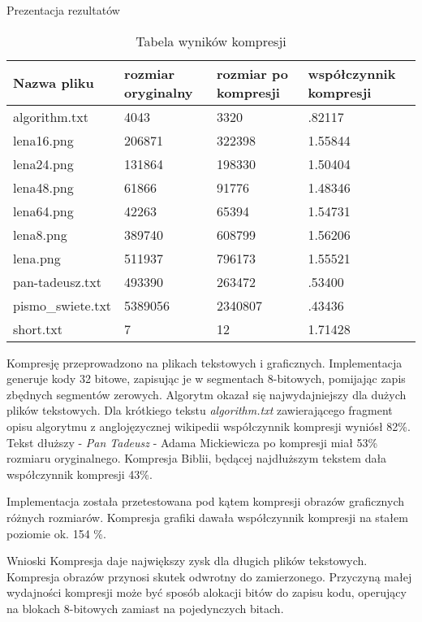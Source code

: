 \documentclass{article}
\begin{document}
  \begin{section}{Prezentacja rezultatów}
    \begin{table}[h]
    \begin{tabular}{| l | l | l | l |}
      \hline
      Nazwa pliku		& rozmiar oryginalny	& rozmiar po kompresji& współczynnik kompresji	\\\hline
      \hline
      algorithm.txt		&	4043	&	3320	&	.82117	\\\hline
      lena16.png		&	206871	&	322398	&	1.55844	\\\hline
      lena24.png		&	131864	&	198330	&	1.50404	\\\hline
      lena48.png		&	61866	&	91776	&	1.48346	\\\hline
      lena64.png		&	42263	&	65394	&	1.54731	\\\hline
      lena8.png			&	389740	&	608799	&	1.56206	\\\hline
      lena.png			&	511937	&	796173	&	1.55521	\\\hline
      pan-tadeusz.txt		&	493390	&	263472	&	.53400	\\\hline
      pismo\_swiete.txt		&	5389056	&	2340807	&	.43436	\\\hline
      short.txt			&	7	&	12	&	1.71428	\\\hline
    \end{tabular}
    \caption{Tabela wyników kompresji}
    \end{table}
    Kompresję przeprowadzono na plikach tekstowych i graficznych. 
    Implementacja generuje kody 32 bitowe, zapisując je w segmentach 8-bitowych, pomijając zapis
    zbędnych segmentów zerowych. 
    Algorytm okazał się najwydajniejszy dla dużych plików tekstowych.
    Dla krótkiego tekstu \textit{algorithm.txt} zawierającego fragment opisu algorytmu z anglojęzycznej wikipedii
    współczynnik kompresji wyniósł 82\%.
    Tekst dłuższy - \textit{Pan Tadeusz} - Adama Mickiewicza po kompresji miał 53\% rozmiaru oryginalnego.
    Kompresja Biblii, będącej najdłuższym tekstem dała współczynnik kompresji 43\%.

    Implementacja została przetestowana pod kątem kompresji obrazów graficznych różnych rozmiarów.
    Kompresja grafiki dawała współczynnik kompresji na stałem poziomie ok. 154 \%.
  \end{section}
  \begin{section}{Wnioski}
    Kompresja daje największy zysk dla długich plików tekstowych. 
    Kompresja obrazów przynosi skutek odwrotny do zamierzonego.
    Przyczyną małej wydajności kompresji może być sposób alokacji bitów do zapisu kodu, 
    operujący na blokach 8-bitowych zamiast na pojedynczych bitach.
  \end{section}
\end{document}
